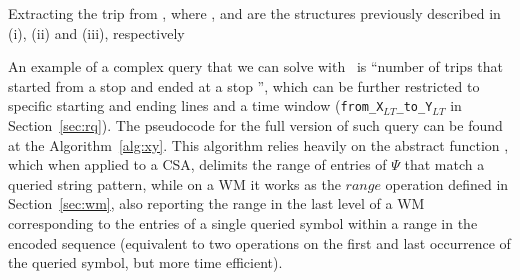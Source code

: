	\begin{algorithm}[ht]
     
     
     \caption{Extracting the trip  from \ctr, where ,  and  are the structures previously described in (i), (ii) and (iii), respectively}
     \label{alg:extract}
    \end{algorithm}
    
    An example of a complex query that we can solve with \ctr~is ``number of trips that started from a stop  and ended at a stop '', which can be further restricted to specific starting and ending lines and a time window (\texttt{from\_X$_{LT}$\_to\_Y$_{LT}$} in Section~\ref{sec:rq}). The pseudocode for the full version of such query can be found at the Algorithm~\ref{alg:xy}. This algorithm relies heavily on the abstract function , which when applied to a CSA, delimits the range of entries of $\Psi$ that match a queried string pattern, while on a WM it works as the $range$ operation defined in Section~\ref{sec:wm}, also reporting the range in the last level of a WM corresponding to the entries of a single queried symbol within a range in the encoded sequence (equivalent to two  operations on the first and last occurrence of the queried symbol, but more time efficient).
    
